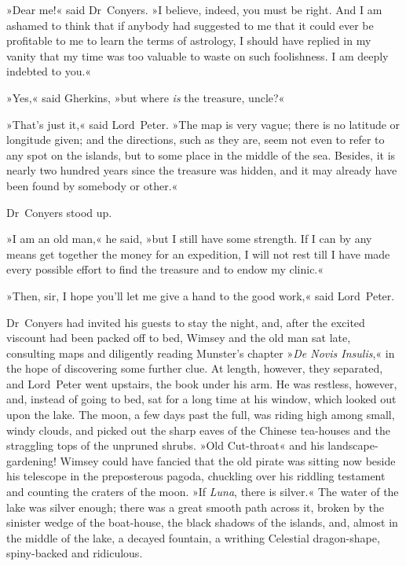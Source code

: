»Dear me!« said Dr~Conyers. »I believe, indeed, you must be right. And I am ashamed to think that if anybody had suggested to me that it could ever be profitable to me to learn the terms of astrology, I should have replied in my vanity that my time was too valuable to waste on such foolishness. I am deeply indebted to you.«

»Yes,« said Gherkins, »but where \textit{is} the treasure, uncle?«

»That's just it,« said Lord~Peter. »The map is very vague; there is no latitude or longitude given; and the directions, such as they are, seem not even to refer to any spot on the islands, but to some place in the middle of the sea. Besides, it is nearly two hundred years since the treasure was hidden, and it may already have been found by somebody or other.«

Dr~Conyers stood up.

»I am an old man,« he said, »but I still have some strength. If I can by any means get together the money for an expedition, I will not rest till I have made every possible effort to find the treasure and to endow my clinic.«

»Then, sir, I hope you'll let me give a hand to the good work,« said Lord~Peter.

\divider

Dr~Conyers had invited his guests to stay the night, and, after the excited viscount had been packed off to bed, Wimsey and the old man sat late, consulting maps and diligently reading Munster's chapter »\textit{De Novis Insulis},« in the hope of discovering some further clue. At length, however, they separated, and Lord~Peter went upstairs, the book under his arm. He was restless, however, and, instead of going to bed, sat for a long time at his window, which looked out upon the lake. The moon, a few days past the full, was riding high among small, windy clouds, and picked out the sharp eaves of the Chinese tea-houses and the straggling tops of the unpruned shrubs. »Old Cut-throat« and his landscape-gardening! Wimsey could have fancied that the old pirate was sitting now beside his telescope in the preposterous pagoda, chuckling over his riddling testament and counting the craters of the moon. »If \textit{Luna}, there is silver.« The water of the lake was silver enough; there was a great smooth path across it, broken by the sinister wedge of the boat-house, the black shadows of the islands, and, almost in the middle of the lake, a decayed fountain, a writhing Celestial dragon-shape, spiny-backed and ridiculous.

